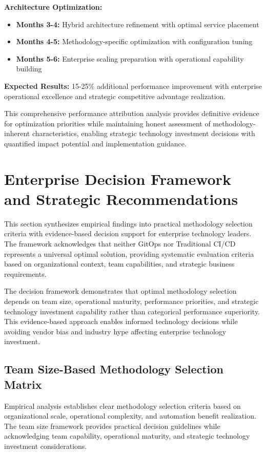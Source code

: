 \textbf{Architecture Optimization:}
\begin{itemize}
\item \textbf{Months 3-4:} Hybrid architecture refinement with optimal service placement
\item \textbf{Months 4-5:} Methodology-specific optimization with configuration tuning
\item \textbf{Months 5-6:} Enterprise scaling preparation with operational capability building
\end{itemize}

\textbf{Expected Results:} 15-25\% additional performance improvement with enterprise operational excellence and strategic competitive advantage realization.

This comprehensive performance attribution analysis provides definitive evidence for optimization priorities while maintaining honest assessment of methodology-inherent characteristics, enabling strategic technology investment decisions with quantified impact potential and implementation guidance.

\section{Enterprise Decision Framework and Strategic Recommendations}
\label{sec:enterprise_framework}

This section synthesizes empirical findings into practical methodology selection criteria with evidence-based decision support for enterprise technology leaders. The framework acknowledges that neither GitOps nor Traditional CI/CD represents a universal optimal solution, providing systematic evaluation criteria based on organizational context, team capabilities, and strategic business requirements.

The decision framework demonstrates that optimal methodology selection depends on team size, operational maturity, performance priorities, and strategic technology investment capability rather than categorical performance superiority. This evidence-based approach enables informed technology decisions while avoiding vendor bias and industry hype affecting enterprise technology investment.

\subsection{Team Size-Based Methodology Selection Matrix}
\label{subsec:team_size_matrix}

Empirical analysis establishes clear methodology selection criteria based on organizational scale, operational complexity, and automation benefit realization. The team size framework provides practical decision guidelines while acknowledging team capability, operational maturity, and strategic technology investment considerations.

